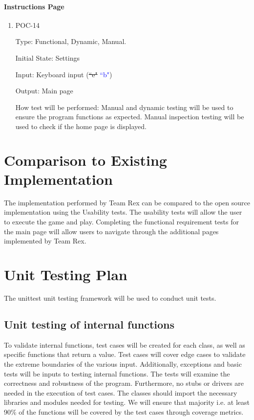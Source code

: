 \documentclass[12pt, titlepage]{article}
\begin{document}
	
	\paragraph{Instructions Page}
	
	\begin{enumerate}
		
		\item{POC-14\\}
		
		Type: Functional, Dynamic, Manual.
		
		Initial State: Settings 
		
		Input: Keyboard input  (\sout{``e"} \textcolor{blue}{``b"})
		
		Output: Main page
		
		How test will be performed: Manual and dynamic testing will be used to ensure the program functions as expected. Manual inspection testing will be used to check if the home page is displayed. 
		
	\end{enumerate}
	
	\section{Comparison to Existing Implementation}	
	The implementation performed by Team Rex can be compared to the open source implementation using the Usability tests. The usability tests will allow the user to execute the game and play. Completing the functional requirement tests for the main page will allow users to navigate through the additional pages implemented by Team Rex. 
	
	
	\section{Unit Testing Plan}
	
	The unittest unit testing framework will be used to conduct unit tests.
	
	\subsection{Unit testing of internal functions}
	
	To validate internal functions, test cases will be created for each class, as well as specific functions that return a value. Test cases will cover edge cases to validate the extreme boundaries of the various input. Additionally, exceptions and basic tests will be inputs to testing internal functions. The tests will examine the correctness and robustness of the program.  Furthermore, no stubs or drivers are needed in the execution of test cases. The classes should import the necessary libraries and modules needed for testing. We will ensure that majority {i.e. at least 90\%} of the functions will be covered by the test cases through coverage metrics. 
	
\end{document}
